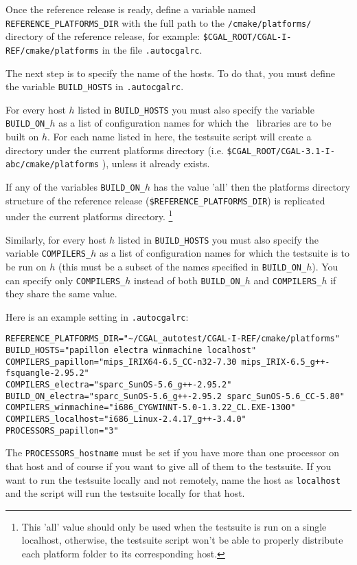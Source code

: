 Once the reference release is ready, define a variable named
{\tt REFERENCE\_PLATFORMS\_DIR} with the full path to the {\tt /cmake/platforms/}
directory of the reference release, for example:
{\tt \$CGAL\_ROOT/CGAL-I-REF/cmake/platforms}
in the file {\tt .autocgalrc}.

The next step is to specify the name of the hosts. To do that, you
must define the variable \texttt{BUILD\_HOSTS} in {\tt .autocgalrc}. 

For every host $h$ listed in \texttt{BUILD\_HOSTS} you
must also specify the variable \texttt{BUILD\_ON\_$h$} as a list of
configuration names for which the \cgal\ libraries are
to be built on $h$. For each name listed in here, the testsuite script 
will create a directory under the current platforms directory
(i.e. {\tt \$CGAL\_ROOT/CGAL-3.1-I-abc/cmake/platforms} ), unless it already exists.

If any of the variables \texttt{BUILD\_ON\_$h$}
has the value 'all' then the platforms directory structure of the reference
release ({\tt \$REFERENCE\_PLATFORMS\_DIR}) is replicated
under the current platforms directory. \footnote{This 'all' value should only be used when
 the testsuite is run on a single localhost, otherwise, the testsuite script won't be able to
properly distribute each platform folder to its corresponding host.}

Similarly, for every host $h$ listed in \texttt{BUILD\_HOSTS} you
must also specify the variable \texttt{COMPILERS\_$h$} as a list of
configuration names for which the testsuite is to be run on $h$
(this must be a subset of the names specified in \texttt{BUILD\_ON\_$h$}).
You can specify only \texttt{COMPILERS\_$h$} instead of both \texttt{BUILD\_ON\_$h$}
and \texttt{COMPILERS\_$h$} if they share the same value.

\noindent Here is an example setting in {\tt .autocgalrc}:

\begingroup\small
\begin{verbatim}
REFERENCE_PLATFORMS_DIR="~/CGAL_autotest/CGAL-I-REF/cmake/platforms"
BUILD_HOSTS="papillon electra winmachine localhost"
COMPILERS_papillon="mips_IRIX64-6.5_CC-n32-7.30 mips_IRIX-6.5_g++-fsquangle-2.95.2"
COMPILERS_electra="sparc_SunOS-5.6_g++-2.95.2"
BUILD_ON_electra="sparc_SunOS-5.6_g++-2.95.2 sparc_SunOS-5.6_CC-5.80"
COMPILERS_winmachine="i686_CYGWINNT-5.0-1.3.22_CL.EXE-1300"
COMPILERS_localhost="i686_Linux-2.4.17_g++-3.4.0"
PROCESSORS_papillon="3" 
\end{verbatim}\endgroup

The {\tt PROCESSORS\_hostname} must be set if you have more
than one processor on that host and of course if you want to give all
of them to the testsuite. If you want to run the testsuite locally and
not remotely, name the host as {\tt localhost} and the script will run
the testsuite locally for that host.

